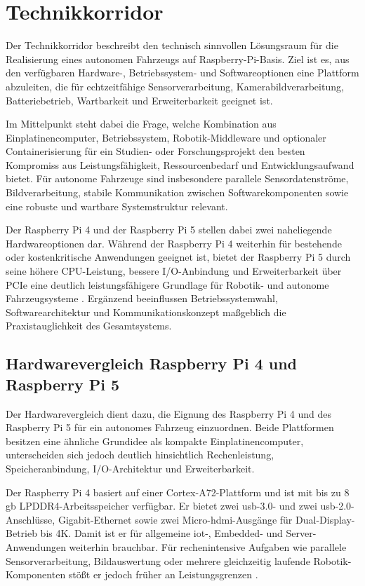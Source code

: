 \section{Technikkorridor}
\label{sec:technikkorridor}

Der Technikkorridor beschreibt den technisch sinnvollen Lösungsraum für die Realisierung eines autonomen Fahrzeugs auf Raspberry-Pi-Basis. Ziel ist es, aus den verfügbaren Hardware-, Betriebssystem- und Softwareoptionen eine Plattform abzuleiten, die für echtzeitfähige Sensorverarbeitung, Kamerabildverarbeitung, Batteriebetrieb, Wartbarkeit und Erweiterbarkeit geeignet ist.

Im Mittelpunkt steht dabei die Frage, welche Kombination aus Einplatinencomputer, Betriebssystem, Robotik-Middleware und optionaler Containerisierung für ein Studien- oder Forschungsprojekt den besten Kompromiss aus Leistungsfähigkeit, Ressourcenbedarf und Entwicklungsaufwand bietet. Für autonome Fahrzeuge sind insbesondere parallele Sensordatenströme, Bildverarbeitung, stabile Kommunikation zwischen Softwarekomponenten sowie eine robuste und wartbare Systemstruktur relevant.

Der Raspberry Pi 4 und der Raspberry Pi 5 stellen dabei zwei naheliegende Hardwareoptionen dar. Während der Raspberry Pi 4 weiterhin für bestehende oder kostenkritische Anwendungen geeignet ist, bietet der Raspberry Pi 5 durch seine höhere CPU-Leistung, bessere I/O-Anbindung und Erweiterbarkeit über PCIe eine deutlich leistungsfähigere Grundlage für Robotik- und autonome Fahrzeugsysteme \cite[Abschnitte ``Memory'', ``Connectivity'' und ``Video \& Sound'']{zotero-item-143} \cite[Abschnitte ``Overview'' und ``Specification'']{zotero-item-144}. Ergänzend beeinflussen Betriebssystemwahl, Softwarearchitektur und Kommunikationskonzept maßgeblich die Praxistauglichkeit des Gesamtsystems.

\subsection{Hardwarevergleich Raspberry Pi 4 und Raspberry Pi 5}
\label{sec:hw_vergleich}

Der Hardwarevergleich dient dazu, die Eignung des Raspberry Pi 4 und des Raspberry Pi 5 für ein autonomes Fahrzeug einzuordnen. Beide Plattformen besitzen eine ähnliche Grundidee als kompakte Einplatinencomputer, unterscheiden sich jedoch deutlich hinsichtlich Rechenleistung, Speicheranbindung, I/O-Architektur und Erweiterbarkeit.

Der Raspberry Pi 4 basiert auf einer Cortex-A72-Plattform und ist mit bis zu 8 \gls{gb} LPDDR4-Arbeitsspeicher verfügbar. Er bietet zwei \gls{usb}-3.0- und zwei \gls{usb}-2.0-Anschlüsse, Gigabit-Ethernet sowie zwei Micro-\gls{hdmi}-Ausgänge für Dual-Display-Betrieb bis 4K. Damit ist er für allgemeine \gls{iot}-, Embedded- und Server-Anwendungen weiterhin brauchbar. Für rechenintensive Aufgaben wie parallele Sensorverarbeitung, Bildauswertung oder mehrere gleichzeitig laufende Robotik-Komponenten stößt er jedoch früher an Leistungsgrenzen \cite[Abschnitte ``Memory'', ``Connectivity'' und ``Video \& Sound'']{zotero-item-143}.


